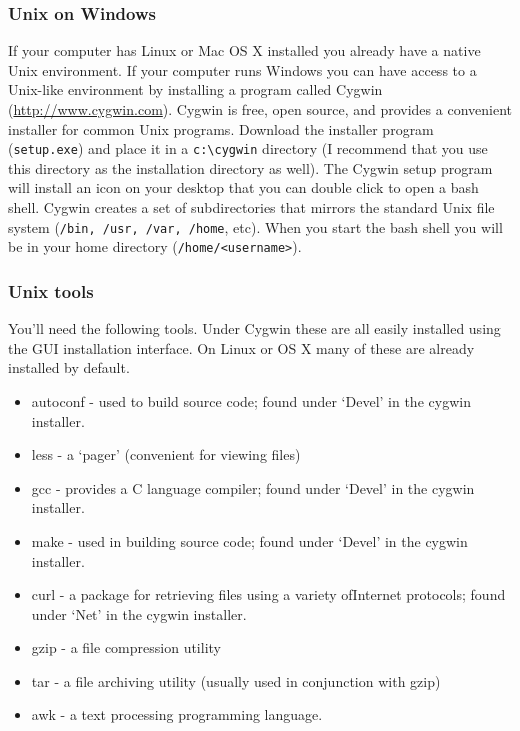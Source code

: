 \subsubsection{Unix on Windows}

If your computer has Linux or Mac OS X installed you already have a native Unix environment.  If your computer runs Windows you can have access to a Unix-like environment by installing a program called Cygwin (\href{http://www.cygwin.com}{http://www.cygwin.com}).  Cygwin is free, open source, and provides a convenient installer for common Unix programs.  Download the installer program (\verb=setup.exe=) and place it in a \verb=c:\cygwin= directory (I recommend that you use this directory as the installation directory as well).  The Cygwin setup program will install an icon on your desktop that you can double click to open a bash shell. Cygwin creates a set of subdirectories that mirrors the standard Unix file system (\verb=/bin, /usr, /var, /home=, etc). When you start the bash shell you will be in your home directory (\verb=/home/<username>=).

\subsubsection{Unix tools}

You'll need the following tools. Under Cygwin these are all easily installed using the GUI installation interface. On Linux or OS X many of these are already installed by default.

\begin{itemize}
    \item autoconf - used to build source code; found under `Devel' in the cygwin installer.
    \item less - a `pager' (convenient for viewing files)
    \item gcc - provides a C language compiler; found under `Devel' in the cygwin installer.
    \item make - used in building source code; found under `Devel' in the cygwin installer.
    \item curl - a package for retrieving files using a variety ofInternet protocols; found under `Net' in the cygwin installer.
    \item gzip - a file compression utility
    \item tar - a file archiving utility (usually used in conjunction with gzip)
    \item awk - a text processing programming language.
\end{itemize}

